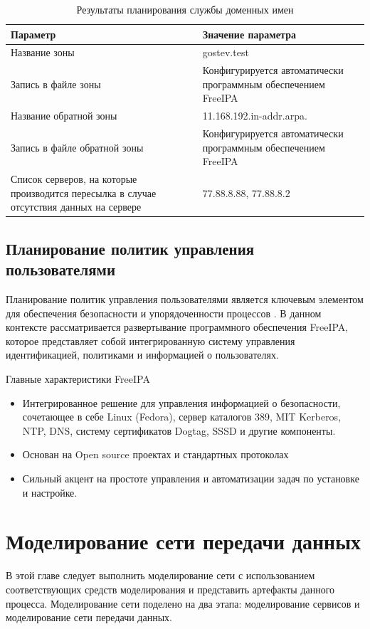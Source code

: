 \documentclass[14pt, a4paper]{extarticle}
\numberwithin{equation}{section}
\begin{document}
\begin{table}[H]
\centering
\small
\label{table:dns_plan}
\caption{Результаты планирования службы доменных имен}
\begin{tabular}{|m{6cm}|m{10cm}|}
\hline
\textbf{Параметр} & \textbf{Значение параметра} \\
\hline
Название зоны &  gostev.test \\
\hline
Запись в файле зоны &  Конфигурируется автоматически программным обеспечением FreeIPA\\
\hline
Название обратной зоны &  11.168.192.in-addr.arpa.\\
\hline
Запись в файле обратной зоны &  Конфигурируется автоматически программным обеспечением FreeIPA\\
\hline
Список серверов, на которые производится пересылка в случае отсутствия данных на сервере &  77.88.8.88, 77.88.8.2\\
\hline
\end{tabular}
\end{table}




\subsection{Планирование политик управления пользователями}
Планирование политик управления пользователями является ключевым элементом для 
обеспечения безопасности и упорядоченности процессов . 
В данном контексте рассматривается развертывание программного обеспечения 
FreeIPA, которое представляет собой интегрированную систему управления идентификацией, 
политиками и информацией о пользователях.

Главные характеристики FreeIPA
\begin{itemize}
        \item Интегрированное решение для управления информацией о безопасности, 
        сочетающее в себе Linux (Fedora), сервер каталогов 389, MIT Kerberos, 
        NTP, DNS, систему сертификатов Dogtag, SSSD и другие компоненты.

        \item Основан на Open source проектах и стандартных протоколах
        \item Сильный акцент на простоте управления и автоматизации задач по установке и настройке.
\end{itemize}



\section{Моделирование сети передачи данных}
В этой главе следует выполнить моделирование сети с использованием соответствующих 
средств моделирования и представить артефакты данного процесса. 
Моделирование сети поделено на два этапа: моделирование сервисов и моделирование сети передачи данных. 
\end{document}

